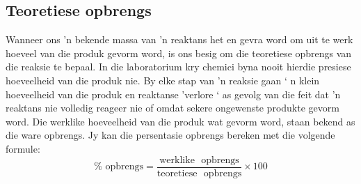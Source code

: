 \subsection*{Teoretiese opbrengs}
Wanneer ons  'n bekende massa van  'n reaktans het en gevra word om uit te werk hoeveel van die produk gevorm word, is ons besig om die teoretiese opbrengs van die reaksie te bepaal. In die laboratorium kry chemici byna nooit hierdie presiese hoeveelheid van die produk nie. By elke stap van  'n reaksie gaan ‘ n klein hoeveelheid van die produk en reaktanse 'verlore ‘ as gevolg van die feit dat   'n reaktans nie volledig reageer nie of omdat sekere ongewenste produkte gevorm word. Die werklike hoeveelheid van die produk wat gevorm word, staan bekend as die ware opbrengs. Jy kan die persentasie opbrengs bereken met die volgende formule:
\begin{equation*}
 \text{\% ~opbrengs} = \frac{\text{werklike ~opbrengs}}{\text{teoretiese ~opbrengs}} \times 100
\end{equation*}


